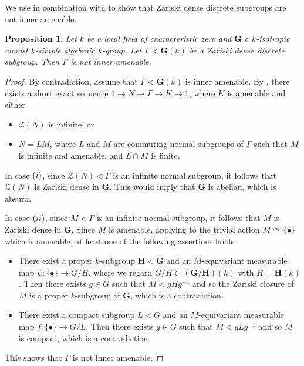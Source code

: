 \documentclass[11pt]{amsart}
\numberwithin{equation}{section}
\theoremstyle{plain}
\newtheorem{prop}[thm]{Proposition}
\theoremstyle{definition}
\begin{document}
We use \cite[Theorem 6.1]{BDL14} in combination with \cite[Theorem 14]{TD14} to show that Zariski dense discrete subgroups are not inner amenable.

\begin{prop}\label{prop-not-inner-amenable}
    Let $k$ be a local field of characteristic zero and $\mathbf G$ a $k$-isotropic almost $k$-simple algebraic $k$-group. Let $\Gamma < \mathbf G(k)$ be a Zariski dense discrete subgroup. Then $\Gamma$ is not inner amenable.
\end{prop}



\begin{proof}
By contradiction, assume that $\Gamma < \mathbf G(k)$ is inner amenable. By \cite[Theorem 14]{TD14}, there exists a short exact sequence $1 \to N \to \Gamma \to K \to 1$, where $K$ is amenable and either
\begin{itemize}
\item [$(\rm i)$] $\mathscr Z(N)$ is infinite, or
\item [$(\rm ii)$] $N = LM$, where $L$ and $M$ are commuting normal subgroups of $\Gamma$ such that $M$ is infinite and amenable, and $L \cap M$ is finite.
\end{itemize}

In case $(\rm i)$, since $\mathscr Z(N) \lhd \Gamma$ is an infinite normal subgroup, it follows that $\mathscr Z(N)$ is Zariski dense in $\mathbf G$. This would imply that $\mathbf G$ is abelian, which is absurd.  

In case $(\rm ii)$, since $M \lhd \Gamma$ is an infinite normal subgroup, it follows that $M$ is Zariski dense in $\mathbf G$. Since $M$ is amenable, applying \cite[Theorem 6.1]{BDL14} to the trivial action $M \curvearrowright \{\bullet\}$ which is amenable, at least one of the following assertions holds:
\begin{itemize}

\item There exist a proper $k$-subgroup $\mathbf H < \mathbf G$ and an $M$-equivariant measurable map $\psi : \{\bullet\} \to G/H$, where we regard $G/H \subset (\mathbf G/\mathbf H)(k)$ with $H = \mathbf H(k)$. Then there exists $g \in G$ such that $M < g H g^{-1}$ and so the Zariski closure of $M$ is a proper $k$-subgroup of $\mathbf G$, which is a contradiction.

\item There exist a compact subgroup $L < G$ and an $M$-equivariant measurable map $f : \{\bullet\} \to G/L$. Then there exists $g \in G$ such that $M < g L g^{-1}$ and so $M$ is compact, which is a contradiction. 
\end{itemize} 
This shows that $\Gamma$ is not inner amenable.
\end{proof}
\end{document}
